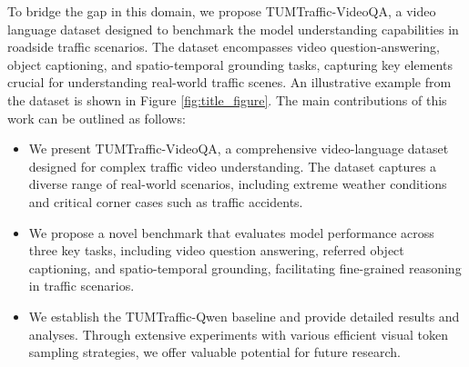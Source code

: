 To bridge the gap in this domain, we propose TUMTraffic-VideoQA, a video language dataset designed to benchmark the model understanding capabilities in roadside traffic scenarios. The dataset encompasses video question-answering, object captioning, and spatio-temporal grounding tasks, capturing key elements crucial for understanding real-world traffic scenes. An illustrative example from the dataset is shown in Figure \ref{fig:title_figure}. The main contributions of this work can be outlined as follows:

\begin{itemize}

 \item We present TUMTraffic-VideoQA, a comprehensive video-language dataset designed for complex traffic video understanding. The dataset captures a diverse range of real-world scenarios, including extreme weather conditions and critical corner cases such as traffic accidents.
 
 \item We propose a novel benchmark that evaluates model performance across three key tasks, including video question answering, referred object captioning, and spatio-temporal grounding, facilitating fine-grained reasoning in traffic scenarios.
 
 \item We establish the TUMTraffic-Qwen baseline and provide detailed results and analyses. Through extensive experiments with various efficient visual token sampling strategies, we offer valuable  potential for future research.
 
\end{itemize}





